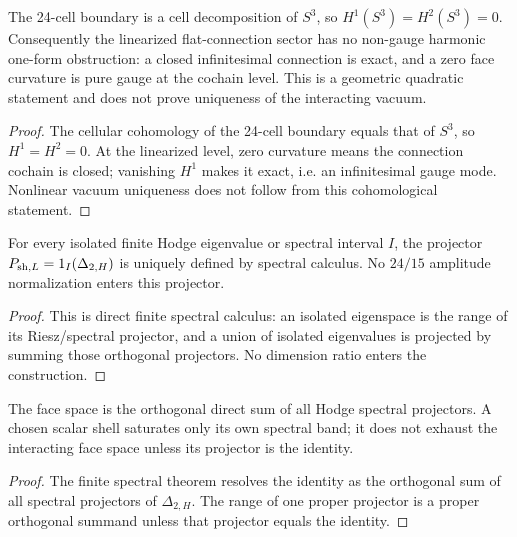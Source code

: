 \documentclass[12pt,a4paper]{article}
\begin{document}
\begin{theorem}
\label{p10:thm:finite-flat-connection-vacuum-support}
The 24-cell boundary is a cell decomposition of \(S^3\), so \(H^1(S^3)=H^2(S^3)=0\).  Consequently the linearized flat-connection sector has no non-gauge harmonic one-form obstruction: a closed infinitesimal connection is exact, and a zero face curvature is pure gauge at the cochain level.  This is a geometric quadratic statement and does not prove uniqueness of the interacting vacuum.
\end{theorem}
\begin{proof}
The cellular cohomology of the 24-cell boundary equals that of $S^3$, so $H^1=H^2=0$.  At the linearized level, zero curvature means the connection cochain is closed; vanishing $H^1$ makes it exact, i.e. an infinitesimal gauge mode.  Nonlinear vacuum uniqueness does not follow from this cohomological statement.
\end{proof}

\begin{lemma}
\label{p10:lem:scalar-shell-dirichlet-kernel}
For every isolated finite Hodge eigenvalue or spectral interval \(I\), the projector \(P_{{\rm sh},L}=1_I(\Delta_{2,H})\) is uniquely defined by spectral calculus.  No \(24/15\) amplitude normalization enters this projector.
\end{lemma}
\begin{proof}
This is direct finite spectral calculus: an isolated eigenspace is the range of its Riesz/spectral projector, and a union of isolated eigenvalues is projected by summing those orthogonal projectors.  No dimension ratio enters the construction.
\end{proof}

\begin{theorem}
\label{p10:thm:scalar-shell-support-saturation}
The face space is the orthogonal direct sum of all Hodge spectral projectors.  A chosen scalar shell saturates only its own spectral band; it does not exhaust the interacting face space unless its projector is the identity.
\end{theorem}
\begin{proof}
The finite spectral theorem resolves the identity as the orthogonal sum of all spectral projectors of $\Delta_{2,H}$.  The range of one proper projector is a proper orthogonal summand unless that projector equals the identity.
\end{proof}
\end{document}
